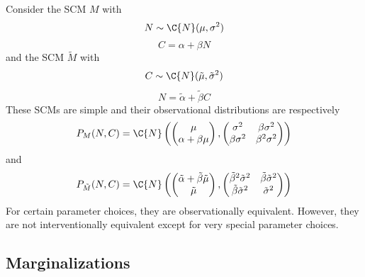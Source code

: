 \begin{Eg}
Consider the SCM $M$ with
$$N \sim \C{N}(\mu,\sigma^2)$$
$$C = \alpha + \beta N$$
and the SCM $\tilde{M}$ with
$$C \sim \C{N}(\tilde{\mu},\tilde{\sigma}^2)$$
$$N = \tilde{\alpha} + \tilde{\beta} C$$
These SCMs are simple and their observational distributions are respectively 
  $$P_M(N,C) = \C{N}\left(\begin{pmatrix} \mu \\ \alpha + \beta \mu \end{pmatrix}, \begin{pmatrix} \sigma^2 & \beta\sigma^2 \\ \beta\sigma^2 & \beta^2\sigma^2\end{pmatrix}\right)$$
and
  $$P_{\tilde{M}}(N,C) = \C{N}\left(\begin{pmatrix} \tilde{\alpha} + \tilde{\beta} \tilde{\mu} \\ \tilde{\mu} \end{pmatrix}, \begin{pmatrix} \tilde{\beta}^2\tilde{\sigma}^2 & \tilde{\beta}\tilde{\sigma}^2 \\ \tilde{\beta}\tilde{\sigma}^2 & \tilde{\sigma}^2\end{pmatrix}\right)$$
For certain parameter choices, they are observationally equivalent.
However, they are not interventionally equivalent except for very special parameter choices.
\end{Eg}

\subsection{Marginalizations}

